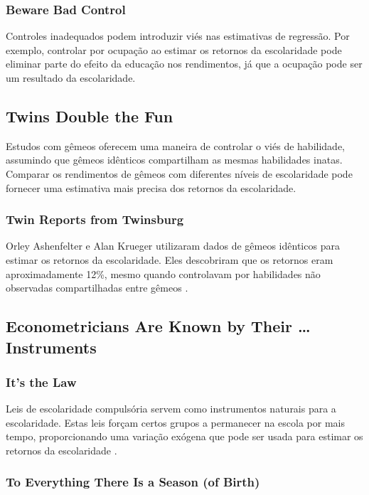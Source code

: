 \documentclass[a4paper,12pt]{article}[abntex2]
\begin{document}
\subsubsection*{Beware Bad Control}

Controles inadequados podem introduzir viés nas estimativas de regressão. Por exemplo, controlar por ocupação ao estimar os retornos da escolaridade pode eliminar parte do efeito da educação nos rendimentos, já que a ocupação pode ser um resultado da escolaridade.

\subsection{Twins Double the Fun}

Estudos com gêmeos oferecem uma maneira de controlar o viés de habilidade, assumindo que gêmeos idênticos compartilham as mesmas habilidades inatas. Comparar os rendimentos de gêmeos com diferentes níveis de escolaridade pode fornecer uma estimativa mais precisa dos retornos da escolaridade.

\subsubsection*{Twin Reports from Twinsburg}

Orley Ashenfelter e Alan Krueger utilizaram dados de gêmeos idênticos para estimar os retornos da escolaridade. Eles descobriram que os retornos eram aproximadamente 12\%, mesmo quando controlavam por habilidades não observadas compartilhadas entre gêmeos  .

\subsection{Econometricians Are Known by Their … Instruments}

\subsubsection*{It’s the Law}

Leis de escolaridade compulsória servem como instrumentos naturais para a escolaridade. Estas leis forçam certos grupos a permanecer na escola por mais tempo, proporcionando uma variação exógena que pode ser usada para estimar os retornos da escolaridade .

\subsubsection*{To Everything There Is a Season (of Birth)}
\end{document}
